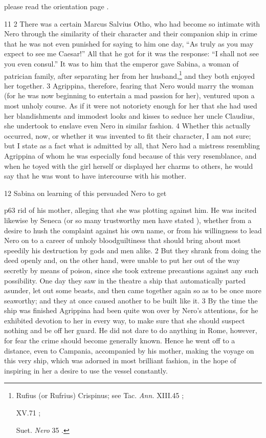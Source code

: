 please read the orientation page .


11
2
There was a certain Marcus Salvius Otho, who had become so intimate with Nero through the similarity of their character and their companion ­ship in crime that he was not even punished for saying to him one day, ``As truly as you may expect to see me Caesar!'' All that he got for it was the response: ``I shall not see you even consul.'' It was to him that the emperor gave Sabina, a woman of patrician family, after separating her from her husband,\texthebrew{⁠}\footnote{Rufius (or Rufrius) Crispinus; see Tac. \emph{Ann.} XIII.45 ;

XV.71 ;

Suet. \emph{Nero} 35 .

} and they both enjoyed her together. 3 Agrippina, therefore, fearing that Nero would marry the woman (for he was now beginning to entertain a mad passion for her), ventured upon a most unholy course. As if it were not notoriety enough for her that she had used her blandishments and immodest looks and kisses to seduce her uncle Claudius, she undertook to enslave even Nero in similar fashion. 4 Whether this actually occurred, now, or whether it was invented to fit their character, I am not sure; but I state as a fact what is admitted by all, that Nero had a mistress resembling Agrippina of whom he was especially fond because of this very resemblance, and when he toyed with the girl herself or displayed her charms to others, he would say that he was wont to have intercourse with his mother.

12
Sabina on learning of this persuaded Nero to get

p63 rid of his mother, alleging that she was plotting against him. He was incited likewise by Seneca (or so many trustworthy men have stated ), whether from a desire to hush the complaint against his own name, or from his willingness to lead Nero on to a career of unholy bloodguiltiness that should bring about most speedily his destruction by gods and men alike. 2 But they shrank from doing the deed openly and, on the other hand, were unable to put her out of the way secretly by means of poison, since she took extreme precautions against any such possibility. One day they saw in the theatre a ship that automatically parted asunder, let out some beasts, and then came together again so as to be once more seaworthy; and they at once caused another to be built like it. 3 By the time the ship was finished Agrippina had been quite won over by Nero's attentions, for he exhibited devotion to her in every way, to make sure that she should suspect nothing and be off her guard. He did not dare to do anything in Rome, however, for fear the crime should become generally known. Hence he went off to a distance, even to Campania, accompanied by his mother, making the voyage on this very ship, which was adorned in most brilliant fashion, in the hope of inspiring in her a desire to use the vessel constantly.

